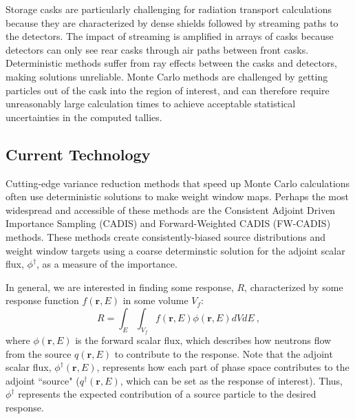 \documentclass[12pt]{article}
\newcommand{\ve}[1]{\ensuremath{\mathbf{#1}}}
\begin{document}
Storage casks are particularly challenging for radiation transport calculations because they are characterized by dense shields followed by streaming paths to the detectors. 
The impact of streaming is amplified in arrays of casks because detectors can only see rear casks through air paths between front casks. 
Deterministic methods suffer from ray effects between the casks and detectors, making solutions unreliable. 
Monte Carlo methods are challenged by getting particles out of the cask into the region of interest, and can therefore require unreasonably large calculation times to achieve acceptable statistical uncertainties in the computed tallies.

\subsection{Current Technology}
Cutting-edge variance reduction methods that speed up Monte Carlo calculations often use deterministic solutions to make weight window maps. 
Perhaps the most widespread and accessible of these methods are the Consistent Adjoint Driven Importance Sampling (CADIS) \cite{wagner_automatic_1997,wagner_automated_1998,haghighat_monte_2003} and Forward-Weighted CADIS (FW-CADIS) \cite{wagner_forward-weighted_2007,wagner_forward-weighted_2009,wagner_forward-weighted_2010} methods. 
These methods create consistently-biased source distributions and weight window targets using a coarse determinstic solution for the adjoint scalar flux, $\phi^{\dagger}$, as a measure of the importance. 

In general, we are interested in finding some response, $R$, characterized by some response function $f(\ve{r}, E)$ in some volume $V_f$:
%
\begin{equation}
 R = \int_E \int_{V_f} f(\ve{r}, E) \phi(\ve{r}, E) dV dE \:,
 \label{eq:Response}
\end{equation}
where $\phi(\ve{r}, E)$ is the forward scalar flux, which describes how neutrons flow from the source $q(\ve{r}, E)$ to contribute to the response. 
Note that the adjoint scalar flux, $\phi^{\dagger}(\ve{r}, E)$, represents how each part of phase space contributes to the adjoint ``source" ($q^{\dagger}(\ve{r}, E)$, which can be set as the response of interest). 
Thus, $\phi^{\dagger}$ represents the expected contribution of a source particle to the desired response.
 
\end{document}
